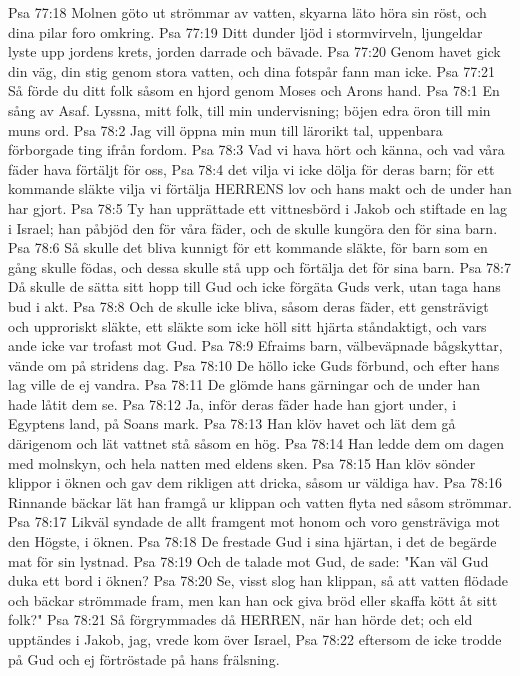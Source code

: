 Psa 77:18  Molnen göto ut strömmar av vatten, skyarna läto höra sin röst, och dina pilar foro omkring.
Psa 77:19  Ditt dunder ljöd i stormvirveln, ljungeldar lyste upp jordens krets, jorden darrade och bävade.
Psa 77:20  Genom havet gick din väg, din stig genom stora vatten, och dina fotspår fann man icke.
Psa 77:21  Så förde du ditt folk såsom en hjord genom Moses och Arons hand.
Psa 78:1  En sång av Asaf. Lyssna, mitt folk, till min undervisning; böjen edra öron till min muns ord.
Psa 78:2  Jag vill öppna min mun till lärorikt tal, uppenbara förborgade ting ifrån fordom.
Psa 78:3  Vad vi hava hört och känna, och vad våra fäder hava förtäljt för oss,
Psa 78:4  det vilja vi icke dölja för deras barn; för ett kommande släkte vilja vi förtälja HERRENS lov och hans makt och de under han har gjort.
Psa 78:5  Ty han upprättade ett vittnesbörd i Jakob och stiftade en lag i Israel; han påbjöd den för våra fäder, och de skulle kungöra den för sina barn.
Psa 78:6  Så skulle det bliva kunnigt för ett kommande släkte, för barn som en gång skulle födas, och dessa skulle stå upp och förtälja det för sina barn.
Psa 78:7  Då skulle de sätta sitt hopp till Gud och icke förgäta Guds verk, utan taga hans bud i akt.
Psa 78:8  Och de skulle icke bliva, såsom deras fäder, ett gensträvigt och upproriskt släkte, ett släkte som icke höll sitt hjärta ståndaktigt, och vars ande icke var trofast mot Gud.
Psa 78:9  Efraims barn, välbeväpnade bågskyttar, vände om på stridens dag.
Psa 78:10  De höllo icke Guds förbund, och efter hans lag ville de ej vandra.
Psa 78:11  De glömde hans gärningar och de under han hade låtit dem se.
Psa 78:12  Ja, inför deras fäder hade han gjort under, i Egyptens land, på Soans mark.
Psa 78:13  Han klöv havet och lät dem gå därigenom och lät vattnet stå såsom en hög.
Psa 78:14  Han ledde dem om dagen med molnskyn, och hela natten med eldens sken.
Psa 78:15  Han klöv sönder klippor i öknen och gav dem rikligen att dricka, såsom ur väldiga hav.
Psa 78:16  Rinnande bäckar lät han framgå ur klippan och vatten flyta ned såsom strömmar.
Psa 78:17  Likväl syndade de allt framgent mot honom och voro gensträviga mot den Högste, i öknen.
Psa 78:18  De frestade Gud i sina hjärtan, i det de begärde mat för sin lystnad.
Psa 78:19  Och de talade mot Gud, de sade: "Kan väl Gud duka ett bord i öknen?
Psa 78:20  Se, visst slog han klippan, så att vatten flödade och bäckar strömmade fram, men kan han ock giva bröd eller skaffa kött åt sitt folk?"
Psa 78:21  Så förgrymmades då HERREN, när han hörde det; och eld upptändes i Jakob, jag, vrede kom över Israel,
Psa 78:22  eftersom de icke trodde på Gud och ej förtröstade på hans frälsning.
